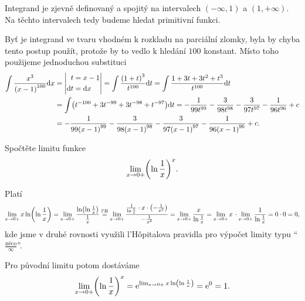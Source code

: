 \documentclass[answers]{exam}
\begin{document}
\begin{questions}
  \begin{solution}
  Integrand je zjevně definovaný a spojitý na intervalech $(-\infty, 1)$ a $(1, +\infty)$. Na těchto intervalech tedy budeme hledat primitivní funkci. 
  
  Byť je integrand ve tvaru vhodném k rozkladu na parciální zlomky, byla by chyba tento postup použít, protože by to vedlo k hledání $100$ konstant. Místo toho použijeme jednoduchou substituci
  \begin{align*}
    \int \frac{x^3}{\parens{x - 1}^{100}} \diff x
    &=
    \left| 
      \begin{aligned}
        t &= x - 1
        \\
        \diff t & = \diff x
      \end{aligned}
    \right|
    =
    \int \frac{\parens{1 + t}^3}{t^{100}} \diff t
    =
    \int \frac{1 + 3t + 3t^2 + t^3}{t^{100}} \diff t  
    \\
    &=
    \int \parens{t^{-100} + 3t^{-99} + 3t^{-98} + t^{-97}} \diff t  
    =
    - \frac{1}{99 t^{99}} - \frac{3}{98 t^{98}} - \frac{3}{97 t^{97}} - \frac{1}{96 t^{96}} + c
    \\
    &=
    - \frac{1}{99 \parens{x - 1}^{99}} - \frac{3}{98 \parens{x - 1}^{98}} - \frac{3}{97 \parens{x - 1}^{97}} - \frac{1}{96 \parens{x - 1}^{96}} + c.
  \end{align*}
  \end{solution}

  \question[2] Spočtěte limitu funkce
  \begin{equation*}
    \lim_{x \to 0+} \parens{\ln \frac{1}{x}}^x.
  \end{equation*}
  
  \begin{solution}
    Platí
    \begin{equation*}
      \lim_{x \to 0+} x \ln \parens{\ln \frac{1}{x}}
      =
      \lim_{x \to 0+} \frac{\ln \parens{\ln \frac{1}{x}}}{\frac{1}{x}}
      \texteq{l'H}
      \lim_{x \to 0+} \frac{\frac{1}{\ln \frac{1}{x}} \cdot x \cdot \parens{-\frac{1}{x^2}}}{- \frac{1}{x^2}}
      =
      \lim_{x \to 0+} \frac{x}{\ln \frac{1}{x}}
      =
      \lim_{x \to 0+} x \, \cdot \lim_{x \to 0+} \frac{1}{\ln \frac{1}{x}} 
      =
      0 \cdot 0
      =
      0,
    \end{equation*} 
    kde jsme v druhé rovnosti využili l'Hôpitalova pravidla pro výpočet limity typu ``$\frac{\textrm{něco}}{\infty}$''. 
    
    Pro původní limitu potom dostáváme
    \begin{equation*}
      \lim_{x \to 0+} \parens{\ln \frac{1}{x}}^x
      =
      \exponential{\lim_{x \to 0+} x \ln \parens{\ln \frac{1}{x}}}
      =
      \exponential{0}
      =
      1.
    \end{equation*}
  \end{solution}
   
\end{questions}
\end{document}
